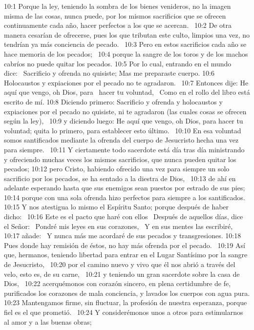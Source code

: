 10:1 Porque la ley, teniendo la sombra de los bienes venideros, no la imagen misma de las cosas, nunca puede, por los mismos sacrificios que se ofrecen continuamente cada año, hacer perfectos a los que se acercan.  
10:2 De otra manera cesarían de ofrecerse, pues los que tributan este culto, limpios una vez, no tendrían ya más conciencia de pecado.  
10:3 Pero en estos sacrificios cada año se hace memoria de los pecados;  
10:4 porque la sangre de los toros y de los machos cabríos no puede quitar los pecados. 
10:5 Por lo cual, entrando en el mundo dice:  
Sacrificio y ofrenda no quisiste; 
Mas me preparaste cuerpo. 
10:6 Holocaustos y expiaciones por el pecado no te agradaron.  
10:7 Entonces dije: He aquí que vengo, oh Dios, para  
hacer tu voluntad,  
Como en el rollo del libro está escrito de mí. 
10:8 Diciendo primero: Sacrificio y ofrenda y holocaustos y expiaciones por el pecado no quisiste, ni te agradaron (las cuales cosas se ofrecen según la ley),  
10:9 y diciendo luego: He aquí que vengo, oh Dios, para hacer tu voluntad; quita lo primero, para establecer esto último.  
10:10 En esa voluntad somos santificados mediante la ofrenda del cuerpo de Jesucristo hecha una vez para siempre.  
10:11 Y ciertamente todo sacerdote está día tras día ministrando y ofreciendo muchas veces los mismos sacrificios, que nunca pueden quitar los pecados; 
10:12 pero Cristo, habiendo ofrecido una vez para siempre un solo sacrificio por los pecados, se ha sentado a la diestra de Dios,  
10:13 de ahí en adelante esperando hasta que sus enemigos sean puestos por estrado de sus pies; 
10:14 porque con una sola ofrenda hizo perfectos para siempre a los santificados.  
10:15 Y nos atestigua lo mismo el Espíritu Santo; porque después de haber dicho:  
10:16 Este es el pacto que haré con ellos  
Después de aquellos días, dice el Señor:  
Pondré mis leyes en sus corazones,  
Y en sus mentes las escribiré, 
10:17 añade:  
Y nunca más me acordaré de sus pecados y transgresiones. 
10:18 Pues donde hay remisión de éstos, no hay más ofrenda por el pecado.  
10:19 Así que, hermanos, teniendo libertad para entrar en el Lugar Santísimo por la sangre de Jesucristo,  
10:20 por el camino nuevo y vivo que él nos abrió a través del velo, esto es, de su carne,  
10:21 y teniendo un gran sacerdote sobre la casa de Dios,  
10:22 acerquémonos con corazón sincero, en plena certidumbre de fe, purificados los corazones de mala conciencia, y lavados los cuerpos con agua pura. 
10:23 Mantengamos firme, sin fluctuar, la profesión de nuestra esperanza, porque fiel es el que prometió.  
10:24 Y considerémonos unos a otros para estimularnos al amor y a las buenas obras;  
